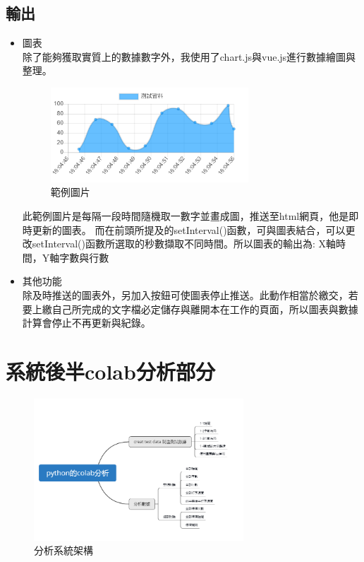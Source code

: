 \subsection{輸出}
\begin{itemize}
	\item 圖表\\
	除了能夠獲取實質上的數據數字外，我使用了chart.js與vue.js進行數據繪圖與整理。\cite{name21}
	\begin{figure}[H] %
		\centering %
		\includegraphics[width=0.7\textwidth]{3_1_3.png} %
		\caption{範例圖片} %
		\label{Fig.main2} %
	\end{figure}
此範例圖片是每隔一段時間隨機取一數字並畫成圖，推送至html網頁，他是即時更新的圖表。
而在前頭所提及的setInterval()函數，可與圖表結合，可以更改setInterval()函數所選取的秒數擷取不同時間。所以圖表的輸出為: X軸時間，Y軸字數與行數
	\item 其他功能\\
	除及時推送的圖表外，另加入按鈕可使圖表停止推送。此動作相當於繳交，若要上繳自己所完成的文字檔必定儲存與離開本在工作的頁面，所以圖表與數據計算會停止不再更新與紀錄。
\end{itemize}
\section{系統後半colab分析部分}
	\begin{figure}[H] %
	\centering %
	\includegraphics[width=0.7\textwidth]{3_2.png} %
	\caption{分析系統架構} %
	\label{Fig.main2} %
\end{figure}